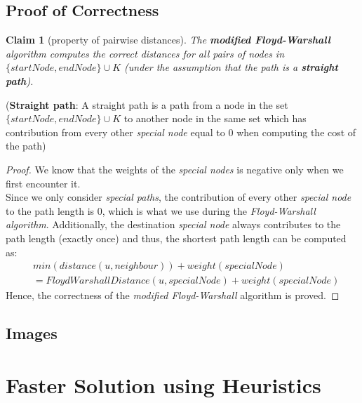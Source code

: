 \documentclass[12pt]{report}
\newtheorem{claim}[theorem]{Claim}
\begin{document}
\section {Proof of Correctness} %
\label{sec:brute-correctness}
\begin{claim}[property of pairwise distances]
\label{claim:dist-prop}
The \textbf{modified Floyd-Warshall} algorithm computes the correct distances for all pairs of nodes in $\{{startNode}, {endNode}\} \cup K$ (under the assumption that the path is a \textbf{straight path}).
\end{claim}
\noindent(\textbf{Straight path}: A straight path is a path from a node in the set $\{{startNode}, {endNode}\} \cup K$ to another node in the same set which has contribution from every other \textit{special node} equal to $0$ when computing the cost of the path)
\begin{proof}
We know that the weights of the \textit{special nodes} is negative only when we first encounter it.\\
Since we only consider \textit{special paths}, the contribution of every other \textit{special node} to the path length is $0$, which is what we use during the \textit{Floyd-Warshall algorithm}. Additionally, the destination \textit{special node} always contributes to the path length (exactly once) and thus, the shortest path length can be computed as:
\begin{equation}
\begin{aligned}
    &{min}({distance}(u, neighbour)) + {weight}({specialNode})\\
    &= {FloydWarshallDistance}(u, {specialNode}) + {weight}({specialNode})
\end{aligned}
\end{equation}
Hence, the correctness of the \textit{modified Floyd-Warshall} algorithm is proved.
\end{proof}

\section{Images} %

\chapter{Faster Solution using Heuristics}
\end{document}
